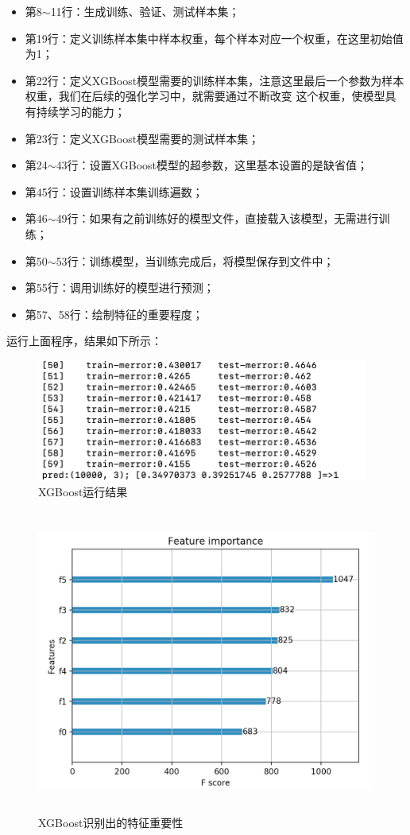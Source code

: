 \documentclass{article}
\begin{document}
\begin{itemize}
\item 第8$\sim$11行：生成训练、验证、测试样本集；
\item 第19行：定义训练样本集中样本权重，每个样本对应一个权重，在这里初始值为1；
\item 第22行：定义XGBoost模型需要的训练样本集，注意这里最后一个参数为样本权重，我们在后续的强化学习中，就需要通过不断改变
这个权重，使模型具有持续学习的能力；
\item 第23行：定义XGBoost模型需要的测试样本集；
\item 第24$\sim$43行：设置XGBoost模型的超参数，这里基本设置的是缺省值；
\item 第45行：设置训练样本集训练遍数；
\item 第46$\sim$49行：如果有之前训练好的模型文件，直接载入该模型，无需进行训练；
\item 第50$\sim$53行：训练模型，当训练完成后，将模型保存到文件中；
\item 第55行：调用训练好的模型进行预测；
\item 第57、58行：绘制特征的重要程度；
\end{itemize}
运行上面程序，结果如下所示：
\begin{figure}[H]
    \caption{XGBoost运行结果}
    \label{f000093}
    \centering
    \includegraphics[height=4cm]{images/f000093}
\end{figure}
\begin{figure}[H]
    \caption{XGBoost识别出的特征重要性}
    \label{f000094}
    \centering
    \includegraphics[height=10cm]{images/f000094}
\end{figure}
\end{document}

